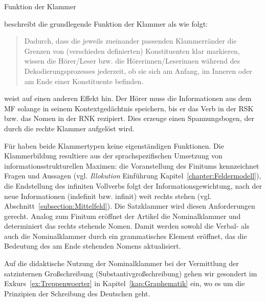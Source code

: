 \begin{Exkurs}{Funktion der Klammer}
 
\citet[95]{Ronneberger-Sibold2010} beschreibt die grundlegende Funktion der Klammer als  wie folgt: 

\begin{quote}
    
Dadurch, dass die jeweils zueinander passenden Klammerränder die Grenzen von (verschieden definierten) Konstituenten klar markieren, wissen die Hörer/Leser bzw. die Hörerinnen/Leserinnen während des Dekodierungsprozesses jederzeit, ob sie sich am Anfang, im Inneren oder am Ende einer Konstituente befinden. \citep[95]{Ronneberger-Sibold2010}  

\end{quote}
\citet[356]{Weinrich2003} weist auf einen anderen Effekt hin. Der Hörer muss die Informationen aus dem MF solange in seinem Kontextgedächtnis speichern, bis er das Verb in der RSK bzw. das Nomen in der RNK rezipiert. Dies erzeuge einen Spannungsbogen, der durch die rechte Klammer aufgelöst wird. 

Für \citet[223--236]{Bittner2010} haben beide Klammertypen keine eigenständigen Funktionen. Die Klammerbildung resultiere aus der sprachspezifischen Umsetzung von informationsstrukturellen Maximen: die Voranstellung des Finitums kennzeichnet Fragen und Aussagen (vgl. \textit{Illokution} Einführung Kapitel~\ref{chapter:Feldermodell}), die Endstellung des infiniten Vollverbs folgt der Informationsgewichtung, nach der neue Informationen (indefinit bzw. infinit) weit rechts stehen (vgl. Abschnitt~\ref{subsection:Mittelfeld}). Die Satzklammer wird diesen Anforderungen gerecht. Analog zum Finitum eröffnet der Artikel die Nominalklammer und determiniert das rechts stehende Nomen. Damit werden sowohl die Verbal- als auch die Nominalklammer durch ein grammatisches Element eröffnet, das die Bedeutung des am Ende stehenden Nomens aktualisiert.  

Auf die didaktische Nutzung der Nominalklammer bei der Vermittlung der satzinternen Großschreibung (Substantivgroßschreibung) gehen wir gesondert im Exkurs~\ref{ex:Treppenwoerter} in Kapitel~\ref{kap:Graphematik} ein, wo es um die Prinzipien der Schreibung des Deutschen geht.

\end{Exkurs}


